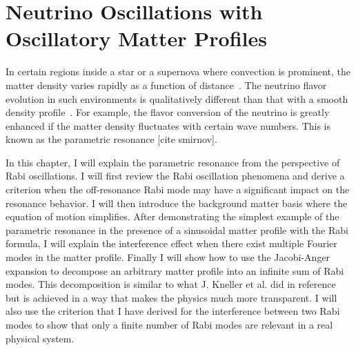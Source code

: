
\chapter{\label{chap:matter}Neutrino Oscillations with Oscillatory Matter Profiles}

In certain regions inside a star or a supernova where convection is prominent, the matter density varies rapidly as a function of distance~\cite{Muller2015, Couch2015}. The neutrino flavor evolution in such environments is qualitatively different than that with a smooth density profile~\cite{Krastev1989, Loreti1994,Akhmedov2000, Friedland2006,Kneller2010,Kneller2013,Patton2014}. For example, the flavor conversion of the neutrino is greatly enhanced if the matter density fluctuates with certain wave numbers. This is known as the parametric resonance [cite smirnov].

In this chapter, I will explain the parametric resonance from the perspective of Rabi oscillations. I will first review the Rabi oscillation phenomena and derive a criterion when the off-resonance Rabi mode may have a significant impact on the resonance behavior. I will then introduce the background matter basis where the equation of motion simplifies. After demonstrating the simplest example of the parametric resonance in the presence of a sinusoidal matter profile with the Rabi formula, I will explain the interference effect when there exist multiple Fourier modes in the matter profile. Finally I will show how to use the Jacobi-Anger expansion to decompose an arbitrary matter profile into an infinite sum of Rabi modes. This decomposition is similar to what J. Kneller et al. did in reference \cite{Kneller2013,Patton2014} but is achieved in a way that makes the physics much more transparent. I will also use the criterion that I have derived for the interference between two Rabi modes to show that only a finite number of Rabi modes are relevant in a real physical system.




